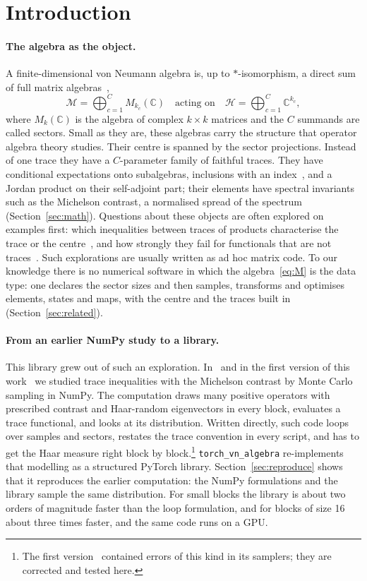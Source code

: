 \documentclass[11pt]{article}
\newcommand{\C}{\mathbb{C}}
\newcommand{\M}{\mathcal{M}}
\begin{document}
\section{Introduction}\label{sec:intro}

\paragraph{The algebra as the object.} A finite-dimensional von Neumann algebra is, up to $*$-isomorphism, a direct
sum of full matrix algebras~\cite{takesaki2002},
\begin{equation}\label{eq:M}
  \M=\bigoplus_{c=1}^{C}M_{k_c}(\C)\quad\text{acting on}\quad\mathcal H=\bigoplus_{c=1}^C\C^{k_c},
\end{equation}
where $M_k(\C)$ is the algebra of complex $k\times k$ matrices and the $C$ summands are called sectors. Small as they
are, these algebras carry the structure that operator algebra theory studies. Their centre is spanned by the sector
projections. Instead of one trace they have a $C$-parameter family of faithful traces. They have conditional
expectations onto subalgebras, inclusions with an index~\cite{jones1983,ghj1989}, and a Jordan product on their
self-adjoint part; their elements have spectral invariants such as the Michelson contrast, a normalised spread of the spectrum
(Section~\ref{sec:math}). Questions about these
objects are often explored on examples first: which inequalities between traces of products characterise the trace or
the centre~\cite{gardner1979,petz1988,novikov2015,virosztek2017}, and how strongly they fail for functionals that are
not traces~\cite{abed2024}. Such explorations are usually written as ad hoc matrix code. To our knowledge there is no
numerical software in which the algebra~\eqref{eq:M} is the data type: one declares the sector sizes and then samples,
transforms and optimises elements, states and maps, with the centre and the traces built in (Section~\ref{sec:related}).

\paragraph{From an earlier NumPy study to a library.} This library grew out of such an exploration. In~\cite{abed2024}
and in the first version of this work~\cite{v1} we studied trace inequalities with the Michelson contrast by Monte
Carlo sampling in NumPy. The computation draws many positive operators with prescribed contrast and Haar-random
eigenvectors in every block, evaluates a trace functional, and looks at its distribution. Written directly, such code
loops over samples and sectors, restates the trace convention in every script, and has to get the Haar measure right
block by block.\footnote{The first version~\cite{v1} contained errors of this kind in its samplers; they are
corrected and tested here.} \texttt{torch\_vn\_algebra} re-implements that modelling as a structured PyTorch library.
Section~\ref{sec:reproduce} shows that it reproduces the earlier computation: the NumPy formulations and the library
sample the same distribution. For small blocks the library is about two orders of magnitude faster than the loop
formulation, and for blocks of size 16 about three times faster, and the same code runs on a GPU.
\end{document}
